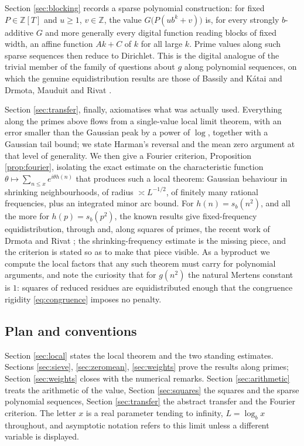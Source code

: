 \documentclass[11pt,reqno]{amsart}
\theoremstyle{plain}
\theoremstyle{definition}
\newcommand{\Z}{\mathbb{Z}}
\begin{document}
Section \ref{sec:blocking} records a sparse polynomial construction: for fixed $P\in\Z[T]$ and $u\ge1$, $v\in\Z$, the value $G\big(P(ub^k+v)\big)$ is, for every strongly $b$-additive $G$ and more generally every digital function reading blocks of fixed width, an affine function $Ak+C$ of $k$ for all large $k$. Prime values along such sparse sequences then reduce to Dirichlet. This is the digital analogue of the trivial member of the family of questions about $g$ along polynomial sequences, on which the genuine equidistribution results are those of Bassily and K\'atai \cite{bassilykatai} and Drmota, Mauduit and Rivat \cite{dmr-polynomial}.

Section \ref{sec:transfer}, finally, axiomatises what was actually used. Everything along the primes above flows from a single-value local limit theorem, with an error smaller than the Gaussian peak by a power of $\log$, together with a Gaussian tail bound; we state Harman's reversal and the mean zero argument at that level of generality. We then give a Fourier criterion, Proposition \ref{prop:fourier}, isolating the exact estimate on the characteristic function $\theta\mapsto\sum_{n\le x}e^{i\theta h(n)}$ that produces such a local theorem: Gaussian behaviour in shrinking neighbourhoods, of radius $\asymp L^{-1/2}$, of finitely many rational frequencies, plus an integrated minor arc bound. For $h(n)=s_b(n^2)$, and all the more for $h(p)=s_b(p^2)$, the known results give fixed-frequency equidistribution, through \cite{drsquares,mauduitrivat-squares} and, along squares of primes, the recent work of Drmota and Rivat \cite{dr-primesquares}; the shrinking-frequency estimate is the missing piece, and the criterion is stated so as to make that piece visible. As a byproduct we compute the local factors that any such theorem must carry for polynomial arguments, and note the curiosity that for $g(n^2)$ the natural Mertens constant is $1$: squares of reduced residues are equidistributed enough that the congruence rigidity \eqref{eq:congruence} imposes no penalty.

\subsection{Plan and conventions}
Section \ref{sec:local} states the local theorem and the two standing estimates. Sections \ref{sec:sieve}, \ref{sec:zeromean}, \ref{sec:weights} prove the results along primes; Section \ref{sec:weights} closes with the numerical remarks. Section \ref{sec:arithmetic} treats the arithmetic of the value, Section \ref{sec:squares} the squares and the sparse polynomial sequences, Section \ref{sec:transfer} the abstract transfer and the Fourier criterion. The letter $x$ is a real parameter tending to infinity, $L=\log_bx$ throughout, and asymptotic notation refers to this limit unless a different variable is displayed.
\end{document}
